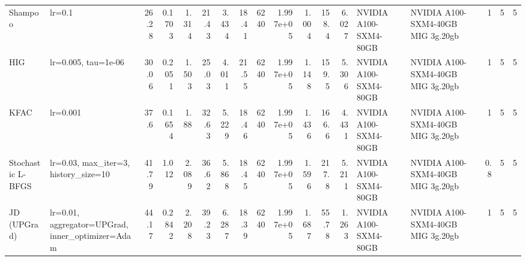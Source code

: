 \begin{tabular}{llrrrrrrrrrrrllrrr}
Shampoo & lr=0.1 & 26.28 & 0.1703 & 1.314 & 21.43 & 3.434 & 18.41 & 6240 & 1.997e+05 & 1.004 & 158.4 & 6.027 & NVIDIA A100-SXM4-80GB & NVIDIA A100-SXM4-40GB MIG 3g.20gb & 1 & 5 & 5 \\
HIG & lr=0.005, tau=1e-06 & 30.06 & 0.2051 & 1.503 & 25.03 & 4.011 & 21.55 & 6240 & 1.997e+05 & 1.148 & 159.5 & 5.306 & NVIDIA A100-SXM4-80GB & NVIDIA A100-SXM4-40GB MIG 3g.20gb & 1 & 5 & 5 \\
KFAC & lr=0.001 & 37.6 & 0.1654 & 1.88 & 32.63 & 5.229 & 18.46 & 6240 & 1.997e+05 & 1.436 & 166.6 & 4.431 & NVIDIA A100-SXM4-80GB & NVIDIA A100-SXM4-40GB MIG 3g.20gb & 1 & 5 & 5 \\
Stochastic L-BFGS & lr=0.03, max\_iter=3, history\_size=10 & 41.79 & 1.012 & 2.089 & 36.62 & 5.868 & 18.45 & 6240 & 1.997e+05 & 1.596 & 217.8 & 5.211 & NVIDIA A100-SXM4-80GB & NVIDIA A100-SXM4-40GB MIG 3g.20gb & 0.8 & 5 & 5 \\
JD (UPGrad) & lr=0.01, aggregator=UPGrad, inner\_optimizer=Adam & 44.17 & 0.2842 & 2.208 & 39.23 & 6.287 & 18.39 & 6240 & 1.997e+05 & 1.687 & 55.78 & 1.263 & NVIDIA A100-SXM4-80GB & NVIDIA A100-SXM4-40GB MIG 3g.20gb & 1 & 5 & 5 \\
\bottomrule
\end{tabular}

